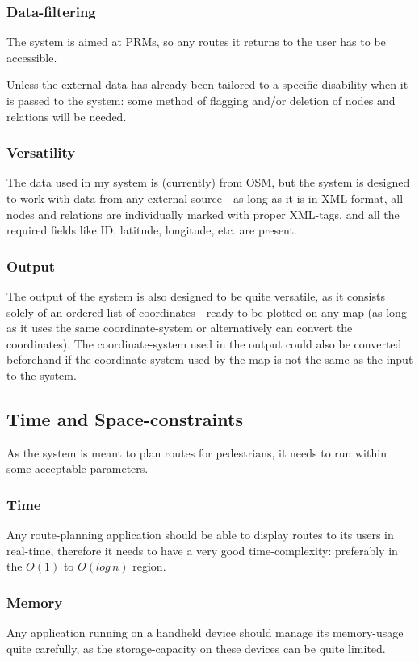 \documentclass[conference]{IEEEtran}
\begin{document}
\subsubsection{Data-filtering}
The system is aimed at PRMs, so any routes it returns to the user has to be accessible.

Unless the external data has already been tailored to a specific disability when it is passed to the system: some method of flagging and/or deletion of nodes and relations will be needed.

\subsubsection{Versatility}
The data used in my system is (currently) from OSM, but the system is designed to work with data from any external source - as long as it is in XML-format, all nodes and relations are individually marked with proper XML-tags, and all the required fields like ID, latitude, longitude,  etc. are present.

\subsubsection{Output}
The output of the system is also designed to be quite versatile, as it consists solely of an ordered list of coordinates - ready to be plotted on any map (as long as it uses the same coordinate-system or alternatively can convert the coordinates). The coordinate-system used in the output could also be converted beforehand if the coordinate-system used by the map is not the same as the input to the system.

\subsection{Time and Space-constraints}
As the system is meant to plan routes for pedestrians, it needs to run within some acceptable parameters.

\subsubsection{Time}
Any route-planning application should be able to display routes to its users in real-time, therefore it needs to have a very good time-complexity: preferably in the $O(1)$ to $O(log\, n)$ region.

\subsubsection{Memory}
Any application running on a handheld device should manage its memory-usage quite carefully, as the storage-capacity on these devices can be quite limited.
\end{document}
